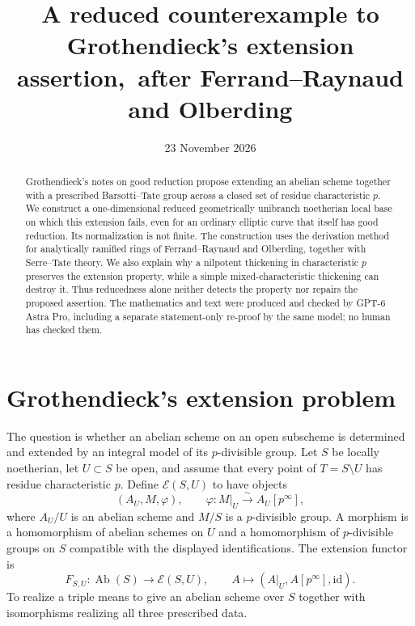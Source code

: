 \documentclass[11pt]{article}
\title{A reduced counterexample to Grothendieck's extension assertion,\ after Ferrand--Raynaud and Olberding}
\author{}
\date{23 November 2026}
\theoremstyle{remark}\newtheorem{remark}[theorem]{Remark}
\newcommand{\Ext}{\mathcal E}
\begin{document}
\maketitle
\begin{abstract}
Grothendieck's notes on good reduction propose extending an abelian scheme together with a prescribed Barsotti--Tate group across a closed set of residue characteristic $p$. We construct a one-dimensional reduced geometrically unibranch noetherian local base on which this extension fails, even for an ordinary elliptic curve that itself has good reduction. Its normalization is not finite. The construction uses the derivation method for analytically ramified rings of Ferrand--Raynaud and Olberding, together with Serre--Tate theory. We also explain why a nilpotent thickening in characteristic $p$ preserves the extension property, while a simple mixed-characteristic thickening can destroy it. Thus reducedness alone neither detects the property nor repairs the proposed assertion. The mathematics and text were produced and checked by GPT-6 Astra Pro, including a separate statement-only re-proof by the same model; no human has checked them.
\end{abstract}

\section{Grothendieck's extension problem}

The question is whether an abelian scheme on an open subscheme is determined and extended by an integral model of its $p$-divisible group. Let $S$ be locally noetherian, let $U\subset S$ be open, and assume that every point of $T=S\setminus U$ has residue characteristic $p$. Define $\Ext(S,U)$ to have objects
\[
 (A_U,M,\varphi),\qquad
 \varphi:M|_U\xrightarrow{\sim}A_U[p^\infty],
\]
where $A_U/U$ is an abelian scheme and $M/S$ is a $p$-divisible group. A morphism is a homomorphism of abelian schemes on $U$ and a homomorphism of $p$-divisible groups on $S$ compatible with the displayed identifications. The extension functor is
\[
 F_{S,U}:\operatorname{Ab}(S)\longrightarrow\Ext(S,U),
 \qquad A\longmapsto(A|_U,A[p^\infty],\mathrm{id}).
\]
To realize a triple means to give an abelian scheme over $S$ together with isomorphisms realizing all three prescribed data.
\end{document}
